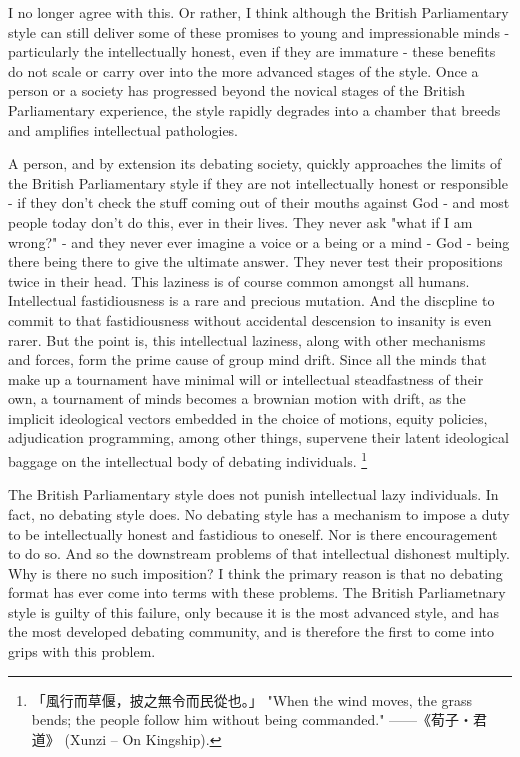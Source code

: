 I no longer agree with this. Or rather, I think although the British Parliamentary style can still deliver some of these promises to young and impressionable minds - particularly the intellectually honest, even if they are immature - these benefits do not scale or carry over into the more advanced stages of the style. Once a person or a society has progressed beyond the novical stages of the British Parliamentary experience, the style rapidly degrades into a chamber that breeds and amplifies intellectual pathologies.


A person, and by extension its debating society, quickly approaches the limits of the British Parliamentary style if they are not intellectually honest or responsible - if they don't check the stuff coming out of their mouths against God - and most people today don't do this, ever in their lives. They never ask "what if I am wrong?" - and they never ever imagine a voice or a being or a mind - God - being there being there to give the ultimate answer. They never test their propositions twice in their head. This laziness is of course common amongst all humans. Intellectual fastidiousness is a rare and precious mutation. And the discpline to commit to that fastidiousness without accidental descension to insanity is even rarer. But the point is, this intellectual laziness, along with other mechanisms and forces, form the prime cause of group mind drift. Since all the minds that make up a tournament have minimal will or intellectual steadfastness of their own, a tournament of minds becomes a brownian motion with drift, as the implicit ideological vectors embedded in the choice of motions, equity policies, adjudication programming, among other things, supervene their latent ideological baggage on the intellectual body of debating individuals. \footnote{「風行而草偃，披之無令而民從也。」
"When the wind moves, the grass bends; the people follow him without being commanded." ——《荀子‧君道》 (Xunzi – On Kingship).
}

The British Parliamentary style does not punish intellectual lazy individuals. In fact, no debating style does. No debating style has a mechanism to impose a duty to be intellectually honest and fastidious to oneself. Nor is there encouragement to do so. And so the downstream problems of that intellectual dishonest multiply. Why is there no such imposition? I think the primary reason is that no debating format has ever come into terms with these problems. The British Parliametnary style is guilty of this failure, only because it is the most advanced style, and has the most developed debating community, and is therefore the first to come into grips with this problem.

